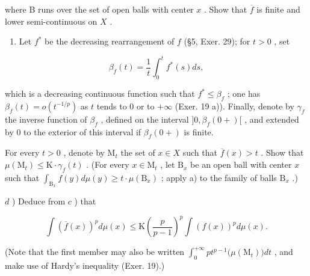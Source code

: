 where B runs over the set of open balls with center \(x\) . Show that \(\overline{f}\) is finite and lower semi-continuous on \(X\) .

\begin{enumerate}
\def\labelenumi{\alph{enumi})}
\setcounter{enumi}{2}
\tightlist
\item
  Let \(f^*\) be the decreasing rearrangement of \(f\) (§5, Exer. 29); for \(t > 0\) , set
\end{enumerate}

\[
\beta_ {f} (t) = \frac {1}{t} \int_ {0} ^ {t} f ^ {*} (s) d s,
\]

which is a decreasing continuous function such that \(f^* \leqslant \beta_f\) ; one has \(\beta_f(t) = o(t^{-1/p})\) as \(t\) tends to 0 or to \(+\infty\) (Exer. 19 a)). Finally, denote by \(\gamma_f\) the inverse function of \(\beta_f\) , defined on the interval \(]0, \beta_f(0+)[\) , and extended by 0 to the exterior of this interval if \(\beta_f(0+)\) is finite.

For every \(t > 0\) , denote by \(\mathrm{M}_t\) the set of \(x \in X\) such that \(\overline{f}(x) > t\) . Show that \(\mu(\mathrm{M}_t) \leqslant \mathrm{K} \cdot \gamma_f(t)\) . (For every \(x \in \mathrm{M}_t\) , let \(\mathrm{B}_x\) be an open ball with center \(x\) such that \(\int_{\mathrm{B}_x} f(y) d\mu(y) \geqslant t \cdot \mu(\mathrm{B}_x)\) ; apply a) to the family of balls \(\mathrm{B}_x\) .)

\(d\) ) Deduce from \(c\) ) that

\[
\int \left(\overline {{f}} (x)\right) ^ {p} d \mu (x) \leqslant \mathrm{K} \left(\frac {p}{p - 1}\right) ^ {p} \int \left(f (x)\right) ^ {p} d \mu (x).
\]

(Note that the first member may also be written \(\int_0^{+\infty}pt^{p - 1}\big(\mu (\mathrm{M}_t)\big)dt\) , and make use of Hardy's inequality (Exer. 19).)
